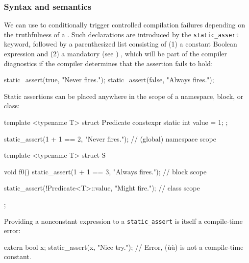 \subsubsection[Syntax and semantics]{Syntax and semantics}\label{syntax-and-semantics}

We can use  to conditionally trigger
controlled compilation failures depending on the truthfulness of a
. Such declarations are introduced by the
\lstinline!static_assert! keyword, followed by a parenthesized list
consisting of (1) a constant Boolean expression and (2) a mandatory (see
)
, which will be
part of the compiler diagnostics if the compiler determines that the
assertion fails to hold:

\begin{emcppslisting}[emcppserrorlines=2]
static_assert(true, "Never fires.");
static_assert(false, "Always fires.");  
\end{emcppslisting}

\newpage%
\noindent Static assertions can be placed anywhere in the scope of a namespace,
block, or class:

\begin{emcppshiddenlisting}[emcppsbatch=e1]
template <typename T> struct Predicate
{
   constexpr static int value = 1;
};
\end{emcppshiddenlisting}
\begin{emcppslisting}[emcppsbatch=e1,emcppserrorlines=8]
static_assert(1 + 1 == 2, "Never fires.");  // (global) namespace scope

template <typename T>
struct S
{
    void f0()
    {
        static_assert(1 + 1 == 3, "Always fires.");  // block scope
    }

    static_assert(!Predicate<T>::value, "Might fire.");  // class scope
};
\end{emcppslisting}

\noindent Providing a nonconstant expression to a \lstinline!static_assert! is
itself a compile-time error:

\begin{emcppslisting}
extern bool x;
static_assert(x, "Nice try.");  // Error, (ù{}ù) is not a compile-time constant.
\end{emcppslisting}


